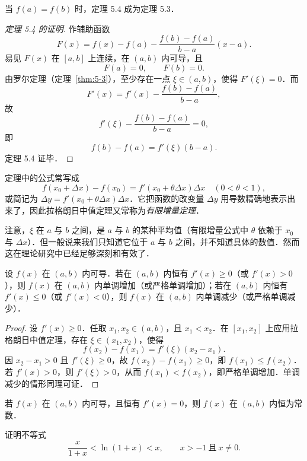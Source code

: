 当 $f(a)=f(b)$ 时，定理 5.4 成为定理 5.3．

\begin{proof}[定理 5.4 的证明]
作辅助函数
\[
F(x) = f(x) - f(a) - \frac{f(b) - f(a)}{b - a}(x - a).
\]
易见 $F(x)$ 在 $[a, b]$ 上连续，在 $(a, b)$ 内可导，且
\[
F(a) = 0,\qquad F(b) = 0.
\]
由罗尔定理（定理~\ref{thm:5-3}），至少存在一点 $\xi \in (a, b)$，使得 $F'(\xi) = 0$．而
\[
F'(x) = f'(x) - \frac{f(b) - f(a)}{b - a},
\]
故
\[
f'(\xi) - \frac{f(b) - f(a)}{b - a} = 0,
\]
即
\[
f(b) - f(a) = f'(\xi)(b - a).
\]
定理 5.4 证毕．
\end{proof}

定理中的公式常写成
\[
f(x_0 + \Delta x) - f(x_0) = f'(x_0 + \theta \Delta x)\Delta x\quad (0 < \theta < 1),
\]
或简记为 $\Delta y = f'(x_0 + \theta \Delta x)\Delta x$．它把函数的改变量 $\Delta y$ 用导数精确地表示出来了，因此拉格朗日中值定理又常称为\emph{有限增量定理}．

注意，$\xi$ 在 $a$ 与 $b$ 之间，是 $a$ 与 $b$ 的某种平均值（有限增量公式中 $\theta$ 依赖于 $x_0$ 与 $\Delta x$）．但一般说来我们只知道它位于 $a$ 与 $b$ 之间，并不知道具体的数值．然而这在理论研究中已经足够深刻和有效了．

\begin{corollary}\label{cor:5-1}
设 $f(x)$ 在 $(a, b)$ 内可导．若在 $(a, b)$ 内恒有 $f'(x) \geqslant 0$（或 $f'(x) > 0$），则 $f(x)$ 在 $(a, b)$ 内单调增加（或严格单调增加）；若在 $(a, b)$ 内恒有 $f'(x) \leqslant 0$（或 $f'(x) < 0$），则 $f(x)$ 在 $(a, b)$ 内单调减少（或严格单调减少）．
\end{corollary}

\begin{proof}
设 $f'(x) \geqslant 0$．任取 $x_1, x_2 \in (a, b)$，且 $x_1 < x_2$．在 $[x_1, x_2]$ 上应用拉格朗日中值定理，存在 $\xi \in (x_1, x_2)$，使得
\[
f(x_2) - f(x_1) = f'(\xi)(x_2 - x_1).
\]
因 $x_2 - x_1 > 0$ 且 $f'(\xi) \geqslant 0$，故 $f(x_2) - f(x_1) \geqslant 0$，即 $f(x_1) \leqslant f(x_2)$．若 $f'(x) > 0$，则 $f'(\xi) > 0$，从而 $f(x_1) < f(x_2)$，即严格单调增加．单调减少的情形同理可证．
\end{proof}

\begin{corollary}\label{cor:5-2}
若 $f(x)$ 在 $(a, b)$ 内可导，且恒有 $f'(x) = 0$，则 $f(x)$ 在 $(a, b)$ 内恒为常数．
\end{corollary}

\begin{example}
证明不等式
\[
\frac{x}{1+x} < \ln(1+x) < x,\qquad x > -1\ \text{且}\ x \neq 0.
\]
\end{example}

